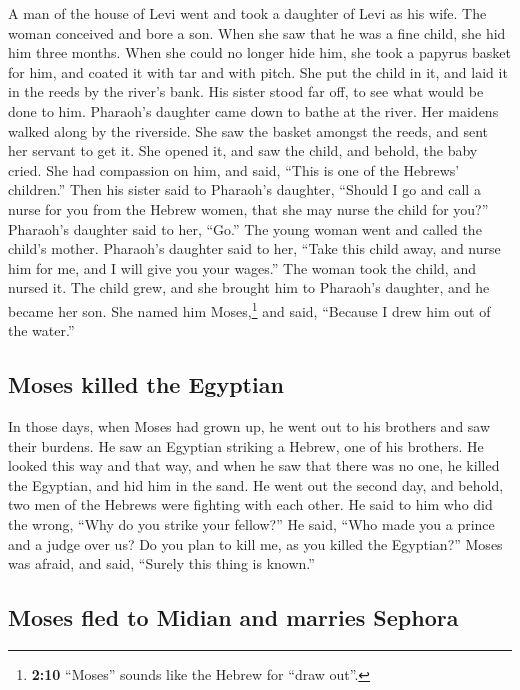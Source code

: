  A man of the house of Levi went and took a daughter of
Levi as his wife.  The woman conceived and bore a son.
When she saw that he was a fine child, she hid him three months.
 When she could no longer hide him, she took a papyrus
basket for him, and coated it with tar and with pitch. She put the child
in it, and laid it in the reeds by the river's bank.  His
sister stood far off, to see what would be done to him. 
Pharaoh's daughter came down to bathe at the river. Her maidens walked
along by the riverside. She saw the basket amongst the reeds, and sent
her servant to get it.  She opened it, and saw the child,
and behold, the baby cried. She had compassion on him, and said, ``This
is one of the Hebrews' children.''  Then his sister said
to Pharaoh's daughter, ``Should I go and call a nurse for you from the
Hebrew women, that she may nurse the child for you?'' 
Pharaoh's daughter said to her, ``Go.'' The young woman went and called
the child's mother.  Pharaoh's daughter said to her,
``Take this child away, and nurse him for me, and I will give you your
wages.'' The woman took the child, and nursed it.  The
child grew, and she brought him to Pharaoh's daughter, and he became her
son. She named him Moses,\footnote{\textbf{2:10} ``Moses'' sounds like
  the Hebrew for ``draw out''.} and said, ``Because I drew him out of
the water.''

\hypertarget{moses-killed-the-egyptian}{%
\subsection{Moses killed the Egyptian}\label{moses-killed-the-egyptian}}

 In those days, when Moses had grown up, he went out to
his brothers and saw their burdens. He saw an Egyptian striking a
Hebrew, one of his brothers.  He looked this way and that
way, and when he saw that there was no one, he killed the Egyptian, and
hid him in the sand.  He went out the second day, and
behold, two men of the Hebrews were fighting with each other. He said to
him who did the wrong, ``Why do you strike your fellow?''
 He said, ``Who made you a prince and a judge over us? Do
you plan to kill me, as you killed the Egyptian?'' Moses was afraid, and
said, ``Surely this thing is known.''

\hypertarget{moses-fled-to-midian-and-marries-sephora}{%
\subsection{Moses fled to Midian and marries
Sephora}\label{moses-fled-to-midian-and-marries-sephora}}

